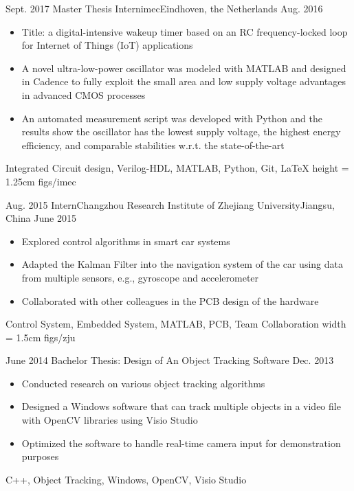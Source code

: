 \documentclass[localFont, alternative]{awesome-source-cv}
\begin{document}
\makecvheaderwithoutphoto

\begin{experiences}
	\experience
		{Sept. 2017}	{Master Thesis Intern}{imec}{Eindhoven, the Netherlands}
		{Aug. 2016}	{
						\begin{itemize}
							\item Title: a digital-intensive wakeup timer based on an RC frequency-locked loop for Internet of Things (IoT) applications
							\item A novel ultra-low-power oscillator was modeled with MATLAB and designed in Cadence to fully exploit the small area and low supply voltage advantages in advanced CMOS processes
							\item An automated measurement script was developed with Python and the results show the oscillator has the lowest supply voltage, the highest energy efficiency, and comparable stabilities w.r.t. the state-of-the-art
						\end{itemize}
					}
								{Integrated Circuit design, Verilog-HDL, MATLAB, Python, Git, \LaTeX}
		 {height = 1.25cm}		{figs/imec}
	\emptySeparator

	\experience
	{Aug. 2015}	{Intern}{Changzhou Research Institute of Zhejiang University}{Jiangsu, China}
	{June 2015}{
					\begin{itemize}
						\item Explored control algorithms in smart car systems
						\item Adapted the Kalman Filter into the navigation system of the car using data from multiple sensors, e.g., gyroscope and accelerometer
						\item Collaborated with other colleagues in the PCB design of the hardware
					\end{itemize}
				}
							{Control System, Embedded System, MATLAB, PCB, Team Collaboration}
	 {width = 1.5cm}		{figs/zju}
\end{experiences}

\begin{projects}
	\project %
		{June 2014}   {Bachelor Thesis: Design of An Object Tracking Software}
		{Dec. 2013} {
											\begin{itemize}
												\item Conducted research on various object tracking algorithms
												\item Designed a Windows software that can track multiple objects in a video file with OpenCV libraries using Visio Studio
												\item Optimized the software to handle real-time camera input for demonstration purposes
											\end{itemize}
										}
										{C++, Object Tracking, Windows, OpenCV, Visio Studio}
\end{projects}
\end{document}
